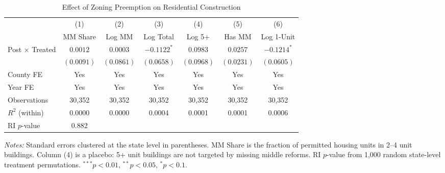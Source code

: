 \begin{table}[htbp]
\centering
\caption{Effect of Zoning Preemption on Residential Construction}
\label{tab:main}
\begin{threeparttable}
\begin{adjustbox}{max width=\textwidth}
\begin{tabular}{lcccccc}
\hline\hline
 & (1) & (2) & (3) & (4) & (5) & (6) \\
 & MM Share & Log MM & Log Total & Log 5+ & Has MM & Log 1-Unit \\
\hline
Post $\times$ Treated & $0.0012$ & $0.0003$ & $-0.1122^{*}$ & $0.0983$ & $0.0257$ & $-0.1214^{*}$ \\
 & $(0.0091)$ & $(0.0861)$ & $(0.0658)$ & $(0.0968)$ & $(0.0231)$ & $(0.0605)$ \\
\hline
County FE & Yes & Yes & Yes & Yes & Yes & Yes \\
Year FE & Yes & Yes & Yes & Yes & Yes & Yes \\
Observations & 30,352 & 30,352 & 30,352 & 30,352 & 30,352 & 30,352 \\
$R^2$ (within) & 0.0000 & 0.0000 & 0.0004 & 0.0001 & 0.0001 & 0.0006 \\
RI $p$-value & 0.882 & & & & & \\
\hline\hline
\end{tabular}
\end{adjustbox}
\begin{tablenotes}[flushleft]\small
\item \textit{Notes:} Standard errors clustered at the state level in parentheses. MM Share is the fraction of permitted housing units in 2--4 unit buildings. Column (4) is a placebo: 5+ unit buildings are not targeted by missing middle reforms. RI $p$-value from 1,000 random state-level treatment permutations. $^{***}p<0.01$, $^{**}p<0.05$, $^{*}p<0.1$.
\end{tablenotes}
\end{threeparttable}
\end{table}

